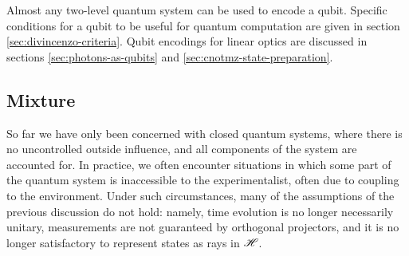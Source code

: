 Almost any two-level quantum system can be used to encode a qubit. Specific conditions for a qubit to be useful for quantum computation are given in section \ref{sec:divincenzo-criteria}. Qubit encodings for linear optics are discussed in sections \ref{sec:photons-as-qubits} and \ref{sec:cnotmz-state-preparation}.

\subsection{Mixture}
\label{sec:background-mixture}
So far we have only been concerned with closed quantum systems, where there is no uncontrolled outside influence, and all components of the system are accounted for. In practice, we often encounter situations in which some part of the quantum system is inaccessible to the experimentalist, often due to coupling to the environment. Under such circumstances, many of the assumptions of the previous discussion do not hold: namely, time evolution is no longer necessarily unitary, measurements are not guaranteed by orthogonal projectors, and it is no longer satisfactory to represent states as rays in $\mathscr{H}$.

